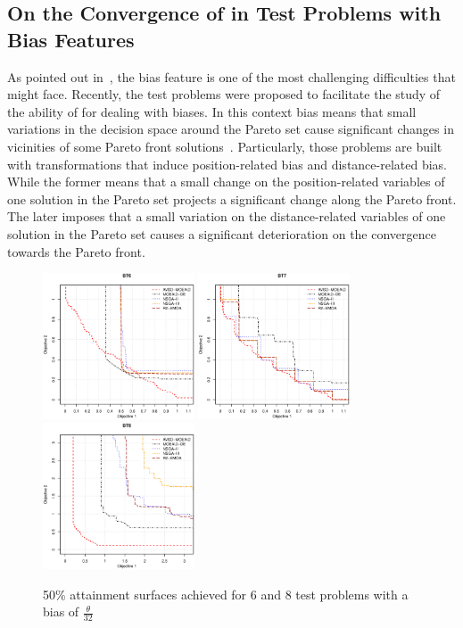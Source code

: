 \subsection{On the Convergence of \MOEAS{} in Test Problems with Bias Features}

As pointed out in~\cite{li2016biased, deb1999multi, huband2006review}, the bias feature is one of the most challenging difficulties that \MOEAS{} might face.
%
Recently, the \BTS{} test problems were proposed to facilitate the study of the ability of \MOEAS{} for dealing with biases.
%
In this context bias means that small variations in the decision space around the Pareto set cause significant changes in vicinities of some Pareto front solutions~\cite{huband2006review}.
%
Particularly, those problems are built with transformations that induce position-related bias and distance-related bias.
%
While the former means that a small change on the position-related variables of one solution in the Pareto set projects a significant change along the Pareto front.
%
The later imposes that a small variation on the distance-related variables of one solution in the Pareto set causes a significant deterioration on the convergence towards the Pareto front.
%
\begin{figure}[t]
\centering
\includegraphics[width=0.4\textwidth]{images/BT6_2_0.031.eps} 
\includegraphics[width=0.4\textwidth]{images/BT7_2_0.031.eps} 
\includegraphics[width=0.4\textwidth]{images/BT8_2_0.031.eps}
\caption{50\% attainment surfaces achieved for \BT{}6 and \BT{}8 test problems with a bias of $\frac{\theta}{32}$}\label{fig:attainment_BT}
\end{figure}

